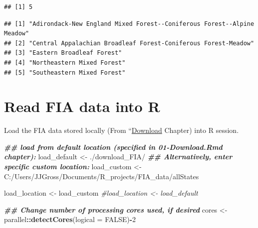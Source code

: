 \documentclass[
]{book}
\newenvironment{Shaded}{\begin{snugshade}}{\end{snugshade}}
\newcommand{\AttributeTok}[1]{\textcolor[rgb]{0.13,0.29,0.53}{#1}}
\newcommand{\CommentTok}[1]{\textcolor[rgb]{0.56,0.35,0.01}{\textit{#1}}}
\newcommand{\ConstantTok}[1]{\textcolor[rgb]{0.56,0.35,0.01}{#1}}
\newcommand{\DecValTok}[1]{\textcolor[rgb]{0.00,0.00,0.81}{#1}}
\newcommand{\DocumentationTok}[1]{\textcolor[rgb]{0.56,0.35,0.01}{\textbf{\textit{#1}}}}
\newcommand{\FunctionTok}[1]{\textcolor[rgb]{0.13,0.29,0.53}{\textbf{#1}}}
\newcommand{\NormalTok}[1]{#1}
\newcommand{\OtherTok}[1]{\textcolor[rgb]{0.56,0.35,0.01}{#1}}
\newcommand{\SpecialCharTok}[1]{\textcolor[rgb]{0.81,0.36,0.00}{\textbf{#1}}}
\newcommand{\StringTok}[1]{\textcolor[rgb]{0.31,0.60,0.02}{#1}}
\begin{document}
\begin{verbatim}
## [1] 5
\end{verbatim}

\begin{Shaded}
\end{Shaded}

\begin{verbatim}
## [1] "Adirondack-New England Mixed Forest--Coniferous Forest--Alpine Meadow"
## [2] "Central Appalachian Broadleaf Forest-Coniferous Forest-Meadow"        
## [3] "Eastern Broadleaf Forest"                                             
## [4] "Northeastern Mixed Forest"                                            
## [5] "Southeastern Mixed Forest"
\end{verbatim}

\hypertarget{read-fia-data-into-r}{%
\section{Read FIA data into R}\label{read-fia-data-into-r}}

Load the FIA data stored locally (From ``\protect\hyperlink{download}{Download} Chapter) into R session.

\begin{Shaded}
\begin{Highlighting}[]
\DocumentationTok{\#\# load from default location (specified in 01{-}Download.Rmd chapter):}
\NormalTok{load\_default }\OtherTok{\textless{}{-}} \StringTok{\textquotesingle{}./download\_FIA/\textquotesingle{}} 
\DocumentationTok{\#\# Alternatively, enter specific custom location:}
\NormalTok{load\_custom }\OtherTok{\textless{}{-}} \StringTok{\textquotesingle{}C:/Users/JJGross/Documents/R\_projects/FIA\_data/allStates\textquotesingle{}}

\NormalTok{load\_location }\OtherTok{\textless{}{-}}\NormalTok{ load\_custom}
\CommentTok{\#load\_location \textless{}{-} load\_default}

\DocumentationTok{\#\# Change number of processing cores used, if desired}
\NormalTok{cores }\OtherTok{\textless{}{-}}\NormalTok{ parallel}\SpecialCharTok{::}\FunctionTok{detectCores}\NormalTok{(}\AttributeTok{logical =} \ConstantTok{FALSE}\NormalTok{)}\SpecialCharTok{{-}}\DecValTok{2} 
\end{Highlighting}
\end{Shaded}
\end{document}

